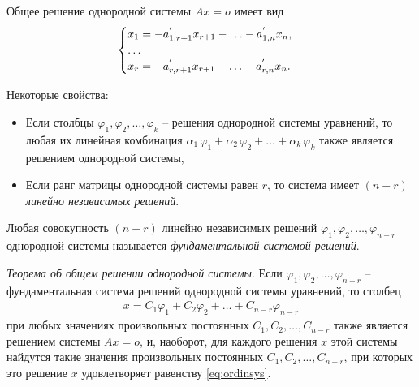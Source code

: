 \documentclass[%
	11pt,
	a4paper,
	utf8,
		]{article}
\begin{document}
Общее решение однородной системы $ Ax = o $ имеет вид \cite[]{bortakovskiy:2005}
\begin{align*}
	\begin{cases}
		x_1 = -a_{1, r + 1}^{'} x_{r + 1} - \ldots - a_{1,n}^{'}x_n,\\
		{\centering \ldots} \\
		x_r = -a_{r, r + 1}^{'} x_{r + 1} - \ldots - a_{r,n}^{'} x_n.
	\end{cases}
\end{align*}

Некоторые свойства:
\begin{itemize}
	\item Если столбцы $ \varphi_1, \varphi_2, \ldots, \varphi_k $ -- решения однородной системы уравнений, то любая их линейная комбинация $ \alpha_1 \, \varphi_1 + \alpha_2 \, \varphi_2 + \ldots + \alpha_k \, \varphi_k $ также является решением однородной системы,
	
	\item Если ранг матрицы однородной системы равен $ r $, то система имеет $ (n - r) $ \emph{линейно независимых решений}.
\end{itemize}

Любая совокупность $ (n - r) $ линейно независимых решений $ \varphi_1, \varphi_2, \ldots, \varphi_{n - r} $ однородной системы называется \emph{фундаментальной системой решений}.

\emph{Теорема об общем решении однородной системы}. Если $ \varphi_1, \varphi_2, \ldots, \varphi_{n - r} $ -- фундаментальная система решений однородной системы уравнений, то столбец
\begin{align}\label{eq:ordinsys}
	x = C_1 \varphi_1 + C_2 \varphi_2 + \ldots + C_{n - r} \varphi_{n - r}
\end{align}
при любых значениях произвольных постоянных $ C_1, C_2, \ldots, C_{n - r} $ также является решением системы $ A x = o $, и, наоборот, для каждого решения $ x $ этой системы найдутся такие значения произвольных постоянных $ C_1, C_2, \ldots, C_{n - r} $, при которых это решение $ x $ удовлетворяет равенству \eqref{eq:ordinsys}.



\begin{thebibliography}{99}
	
	
	
\end{thebibliography}
\end{document}
